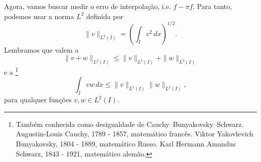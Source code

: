 Agora, vamos buscar medir o erro de interpolação, i.e. $f - \pi f$. Para tanto, podemos usar a norma $L^2$ definida por
\begin{equation}
  \|v\|_{L^2(I)} = \left(\int_I v^2\, dx\right)^{1/2}.
\end{equation}
Lembramos que valem a 
\begin{equation}
  \|v+w\|_{L^2(I)} \leq \|v\|_{L^2(I)} +  \|w\|_{L^2(I)}
\end{equation}
e a \footnote{Também conhecida como desigualdade de Cauchy–Bunyakovsky–Schwarz. Augustin-Louis Cauchy, 1789 - 1857, matemático francês. Viktor Yakovlevich Bunyakovsky, 1804 - 1889, matemático Russo. Karl Hermann Amandus Schwarz, 1843 - 1921, matemático alemão.}
\begin{equation}\label{eq:Cauchy-Schwarz}
  \int_I vw\,dx \leq \|v\|_{L^2(I)}\|w\|_{L^2(I)},
\end{equation}
para qualquer funções $v,w\in L^2(I)$.

